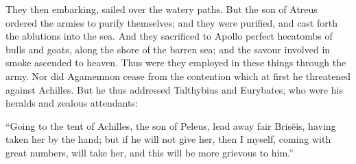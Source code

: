 \documentclass{ransom}
\begin{document}
They then embarking, sailed over the watery
paths. But the son of Atreus ordered the armies to purify themselves; and they were purified, and cast forth the ablutions into the sea.
And they sacrificed to Apollo perfect hecatombs of bulls and goats,
along the shore of the barren sea; and the savour involved in smoke
ascended to heaven. Thus were they employed in these things through the
army. Nor did Agamemnon cease from the contention which at first he
threatened against Achilles. But he thus addressed Talthybius and
Eurybates, who were his heralds and zealous attendants:







“Going to the tent of Achilles, the son of Peleus, lead away fair
Brisëis, having taken her by the hand; but if he will not give her,
then I myself, coming with great numbers, will take her, and this will
be more grievous to him.”
\end{document}

